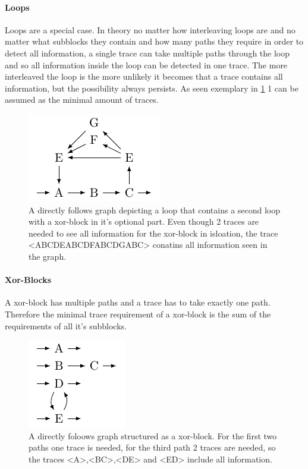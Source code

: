 \documentclass[
	a4paper,
	pagesize,
	pdftex,
	12pt,
	twoside, %
	BCOR=5mm, %
	ngerman,
	fleqn,
	final,
	]{scrartcl}
\begin{document}
\paragraph{Loops}
Loops are a special case. In theory no matter how interleaving loops are and no matter what subblocks they contain and how many paths they require in order to detect all information, a single trace can take multiple paths through the loop and so all information inside the loop can be detected in one trace. The more interleaved the loop is the more unlikely it becomes that a trace contains all information, but the possibility always persists. As seen exemplary in \ref{fig:loopCoverageExample} 1 can be assumed as the minimal amount of traces.
\begin{figure}[h]
  \vspace{-20pt}
	\begin{center}
		\includegraphics[width=.3\linewidth]{img/loop.pdf}
	\end{center}
	  \vspace{-10pt}
	\caption{A directly follows graph depicting a loop that contains a second loop with a xor-block in it's optional part. Even though 2 traces are needed to see all information for the xor-block in isloation, the trace <ABCDEABCDFABCDGABC> conatins all information seen in the graph.}
	\label{fig:loopCoverageExample}
\end{figure}
\paragraph{Xor-Blocks}
A xor-block has multiple paths and a trace has to take exactly one path. Therefore the minimal trace requirement of a xor-block is the sum of the requirements of all it's subblocks. 
\begin{figure}[h]
  \vspace{-20pt}
	\begin{center}
		\includegraphics[width=.25\linewidth]{img/xor.pdf}
	\end{center}
	  \vspace{-10pt}
	\caption{A directly foloows graph structured as a xor-block. For the first two paths one trace is needed, for the third path 2 traces are needed, so the traces <A>,<BC>,<DE> and <ED> include all information.}
	\label{fig:xorCoverageExample}
\end{figure}
\end{document}
